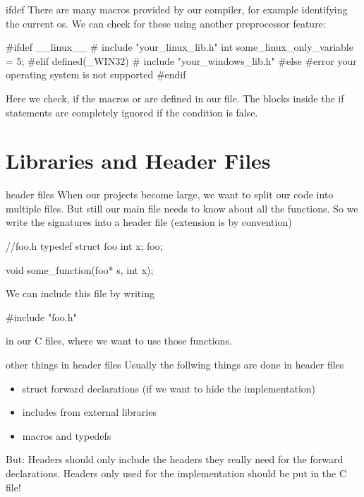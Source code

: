 \documentclass[10pt,graphics,aspectratio=169,table]{beamer}
\begin{document}
\begin{frame}[fragile]{ifdef}
There are many macros provided by our compiler,
for example identifying the current os.
We can check for these using another preprocessor feature: 
\begin{codeblock}
#ifdef __linux__
#   include "your_linux_lib.h"
    int some_linux_only_variable = 5;
#elif defined(_WIN32)
#   include "your_windows_lib.h"
#else
#error your operating system is not supported
#endif
\end{codeblock}

Here we check, if the macros  or  are defined
in our file. The blocks inside the if statements
are completely ignored if the condition is false.
\end{frame}

\section{Libraries and Header Files}

\begin{frame}[fragile]{header files}
When our projects become large, we want to split our code into multiple files.
But still our main file needs to know about all the functions. So we write the
signatures into a header file (extension is  by convention)

\begin{codeblock}
//foo.h
typedef struct foo{
    int x;
}foo;

void some_function(foo* s, int x);

\end{codeblock}

We can include this file by writing
\begin{codeblock}
#include "foo.h"
\end{codeblock}
in our C files, where we want to use those functions.
\end{frame}

\begin{frame}{other things in header files}
Usually the follwing things are done in header files
\begin{itemize}
\item struct forward declarations (if we want to hide the implementation)
\item includes from external libraries
\item macros and typedefs
\end{itemize}

But: Headers should only include the headers they really need for the forward
declarations. Headers only used for the implementation should be put in the
C file!
\end{frame}
\end{document}
